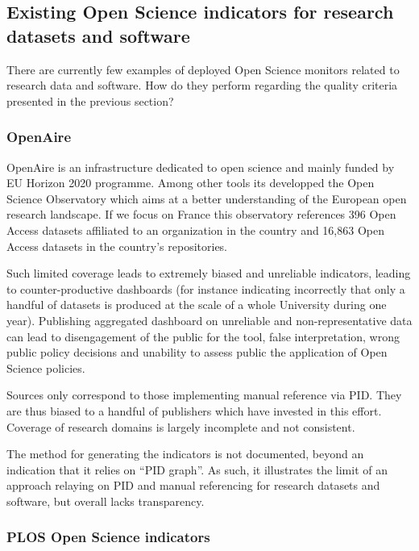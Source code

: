 \documentclass[
]{article}
\begin{document}
\hypertarget{existing-open-science-indicators-for-research-datasets-and-software}{%
\subsection{Existing Open Science indicators for research datasets and
software}\label{existing-open-science-indicators-for-research-datasets-and-software}}

There are currently few examples of deployed Open Science monitors
related to research data and software. How do they perform regarding the
quality criteria presented in the previous section?

\hypertarget{openaire}{%
\subsubsection{OpenAire}\label{openaire}}

OpenAire is an infrastructure dedicated to open science and mainly
funded by EU Horizon 2020 programme. Among other tools its developped
the Open Science Observatory which aims at a better understanding of the
European open research landscape. If we focus on France this observatory
references 396 Open Access datasets affiliated to an organization in the
country and 16,863 Open Access datasets in the country's repositories.

Such limited coverage leads to extremely biased and unreliable
indicators, leading to counter-productive dashboards (for instance
indicating incorrectly that only a handful of datasets is produced at
the scale of a whole University during one year). Publishing aggregated
dashboard on unreliable and non-representative data can lead to
disengagement of the public for the tool, false interpretation, wrong
public policy decisions and unability to assess public the application
of Open Science policies.

Sources only correspond to those implementing manual reference via PID.
They are thus biased to a handful of publishers which have invested in
this effort. Coverage of research domains is largely incomplete and not
consistent.

The method for generating the indicators is not documented, beyond an
indication that it relies on ``PID graph''. As such, it illustrates the
limit of an approach relaying on PID and manual referencing for research
datasets and software, but overall lacks transparency.

\hypertarget{plos-open-science-indicators}{%
\subsubsection{PLOS Open Science
indicators}\label{plos-open-science-indicators}}
\end{document}
